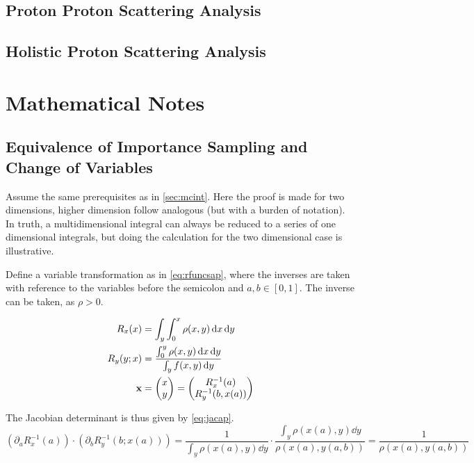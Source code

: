 \subsection{Proton Proton Scattering Analysis}%
\label{sec:ppanalysis}

\subsection{Holistic Proton Scattering Analysis}%
\label{sec:ppanalysisfull}

\section{Mathematical Notes}%
\label{sec:matap}

\subsection{Equivalence of Importance Sampling and Change of
  Variables}%
\label{sec:equap}

Assume the same prerequisites as in \cref{sec:mcint}. Here the proof
is made for two dimensions, higher dimension follow analogous (but
with a burden of notation). In truth, a multidimensional integral can
always be reduced to a series of one dimensional integrals, but doing
the calculation for the two dimensional case is illustrative.

Define a variable transformation as in \cref{eq:rfuncsap}, where the
inverses are taken with reference to the variables before the
semicolon and \(a,b\in [0, 1]\). The inverse can be taken, as
\(\rho > 0\).

\begin{equation}
  \label{eq:rfuncsap}
  \begin{split}
  R_x(x) &= \int_y\int_0^x\rho(x, y) \dd{x}\dd{y} \\
  R_y(y; x) &= \frac{\int_0^y\rho(x, y) \dd{x}\dd{y}}{\int_y
              f(x,y)\dd{y}} \\
  \vb{x} &= \mqty(x \\ y) = \mqty(R_x^{-1}(a) \\ R_y^{-1}(b, x(a)))
  \end{split}
\end{equation}

The Jacobian determinant is thus given by \cref{eq:jacap}.
\begin{equation}
  \label{eq:jacap}
  (\partial_a R_x^{-1}(a))\cdot (\partial_b R_y^{-1}(b; x(a))) =
  \frac{1}{\int_y\rho(x(a), y)\dd{y}}\cdot \frac{\int_y\rho(x(a),
    y)\dd{y}}{\rho(x(a), y(a, b))} = \frac{1}{\rho(x(a), y(a, b))}
\end{equation}

